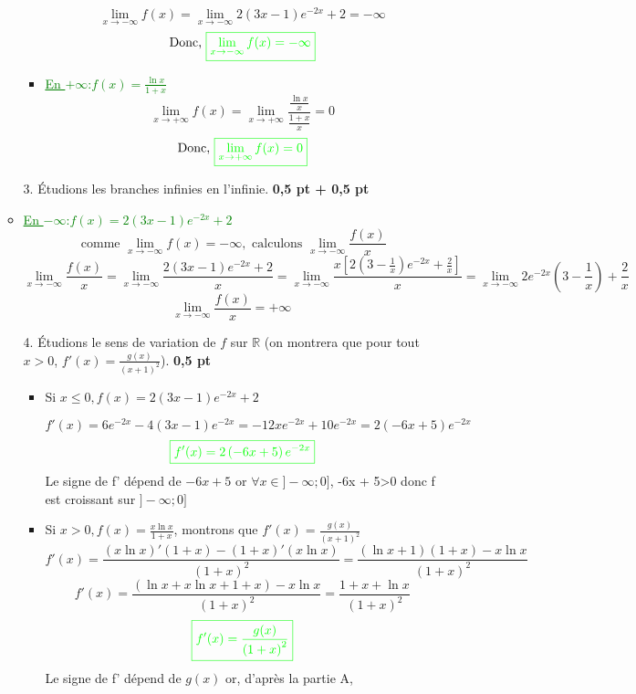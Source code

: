\documentclass[12pt]{article}
\begin{document}
\begin{itemize}
\begin{itemize}
\begin{itemize}
        \[\lim_{x \to -\infty}f(x)=\lim_{x \to -\infty}2(3x - 1)e^{-2x} + 2=-\infty\]
        \[\text{Donc, }\color{green}{\boxed{\lim_{x \to -\infty}f(x)=-\infty}}\]
         \item \textcolor{green}{\underline{En $+\infty$}:$f(x)=\frac{\ln x}{1+x}$}
        \[\lim_{x \to +\infty}f(x)=\lim_{x \to +\infty}\frac{\frac{\ln x}{x}}{\frac{1+x}{x}}=0\]
        \[\text{Donc, }\color{green}{\boxed{\lim_{x \to +\infty}f(x)=0}}\]
        \textcolor{green}{}
        \end{itemize}
        \item[3.] Étudions les branches infinies en l'infinie. \textbf{0,5 pt + 0,5 pt}
        \item \textcolor{green}{\underline{En $-\infty$}:$f(x)=2(3x - 1)e^{-2x} + 2$}
        \[\text{ comme }\lim_{x \to -\infty}f(x)=-\infty, \text{ calculons } \lim_{x \to -\infty}\frac{f(x)}{x}\]
         \[\lim_{x \to -\infty}\frac{f(x)}{x}=\lim_{x \to -\infty}\frac{2(3x - 1)e^{-2x} + 2}{x}=\lim_{x \to -\infty}\frac{x\left[ 2\left( 3 - \frac{1}{x}\right)e^{-2x} + \frac{2}{x}\right] }{x}=\lim_{x \to -\infty}2e^{-2x}\left( 3 - \frac{1}{x}\right) + \frac{2}{x}\]
         \[\lim_{x \to -\infty}\frac{f(x)}{x}=+\infty\]
         \textcolor{green}{}
        \item[4.] Étudions le sens de variation de $f$ sur $\mathbb{R}$ (on montrera que pour tout $x > 0$, $f'(x) = \frac{g(x)}{(x + 1)^{2}}$). \textbf{0,5 pt}
        \begin{itemize}
        	\item Si $x \leq 0, f(x)=2(3x - 1)e^{-2x} + 2$
        	
        	\[f'(x)=6e^{-2x}-4(3x - 1)e^{-2x}=-12xe^{-2x}+10e^{-2x}=2\left(-6x + 5\right) e^{-2x}\]
        	\[\textcolor{green}{\boxed{f'(x)=2\left(-6x + 5\right) e^{-2x}}}\]
Le signe de  f' dépend de $-6x + 5$ or $\forall x\in]-\infty ; 0]$, -6x + 5>0 donc f est croissant sur $]-\infty ; 0]$
			\item Si $x > 0, f(x)=\frac{x\ln x}{1 + x}$, montrons que $f'(x)=\frac{g(x)}{(x + 1)^{2}}$
			\[f'(x)=\frac{(x\ln x)'(1 + x)-(1 + x)'(x\ln x)}{ \left( 1 + x\right)^{2} }=\frac{(\ln x + 1)(1 + x)-x\ln x}{ \left( 1 + x\right)^{2} }\]
			\[f'(x)=\frac{(\ln x + x\ln x + 1 + x)-x\ln x}{ \left( 1 + x\right)^{2} } =\frac{1 + x + \ln x}{\left( 1 + x\right)^{2}} \]
			\[\textcolor{green}{\boxed{f'(x)=\frac{g(x)}{\left( 1 + x\right)^{2}}}}\]
Le signe de f' dépend de $g(x)$ or, d'après la partie A, 


\end{itemize}
\end{itemize}
\end{itemize}
\end{document}
